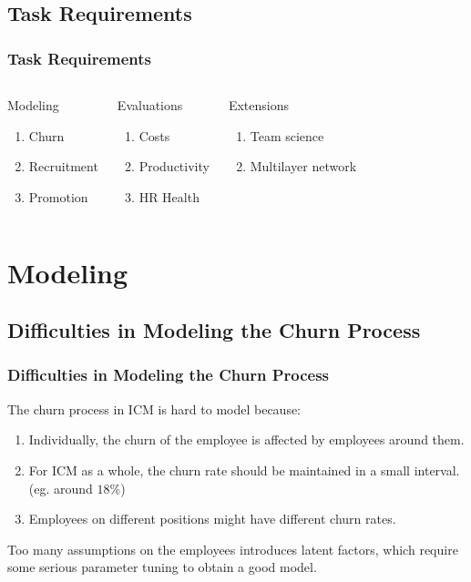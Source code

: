 \documentclass{beamer}
\begin{document}
\subsection{Task Requirements}
\begin{frame}
\frametitle{Task Requirements}
\begin{columns}[c]
\begin{block}{Modeling}
\begin{enumerate}
\item Churn
\item Recruitment
\item Promotion
\end{enumerate}
\end{block}
\begin{block}{Evaluations}
\begin{enumerate}
\item Costs
\item Productivity
\item HR Health
\end{enumerate}
\end{block}
\begin{block}{Extensions}
\begin{enumerate}
\item Team science
\item Multilayer network
\end{enumerate}
\end{block}
\end{columns}
\end{frame}


\section{Modeling}
\subsection{Difficulties in Modeling the Churn Process}
\begin{frame}
\frametitle{Difficulties in Modeling the Churn Process}
The churn process in ICM is hard to model because:
\begin{enumerate}
\item Individually, the churn of the employee is affected by employees around them.
\item For ICM as a whole, the churn rate should be maintained in a small interval. (eg. around $18\%$)
\item Employees on different positions might have different churn rates.

\end{enumerate}

Too many assumptions on the employees introduces latent factors, which require some serious parameter tuning to obtain a good model.


\end{frame}
\end{document}
